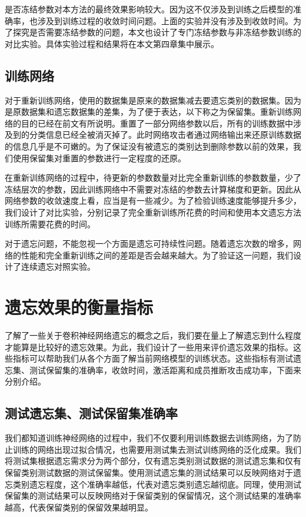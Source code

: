 是否冻结参数对本方法的最终效果影响较大。因为这不仅涉及到训练之后模型的准确率，也涉及到训练过程的收敛时间问题。上面的实验并没有涉及到收敛时间。为了探究是否需要冻结参数的问题，本文也设计了专门冻结参数与非冻结参数训练的对比实验。具体实验过程和结果将在本文第四章集中展示。

\subsection{训练网络}

对于重新训练网络，使用的数据集是原来的数据集减去要遗忘类别的数据集。因为是原数据集和遗忘数据集的差集，为了便于表达，以下称之为保留集。重新训练网络的目的已经在前文有所说明。重置了一部分网络参数以后，所有的训练数据中涉及到的分类信息已经全被消灭掉了。此时网络攻击者通过网络输出来还原训练数据的信息几乎是不可嫩的。为了保证没有被遗忘的类别达到删除参数以前的效果，我们使用保留集对重置的参数进行一定程度的还原。

在重新训练网络的过程中，待更新的参数数量对比完全重新训练的参数数量，少了冻结层次的参数，因此训练网络中不需要对冻结的参数去计算梯度和更新。因此从网络参数的收敛速度上看，应当是有一些减少。为了检验训练速度能够提升多少，我们设计了对比实验，分别记录了完全重新训练所花费的时间和使用本文遗忘方法训练所需要花费的时间。

对于遗忘问题，不能忽视一个方面是遗忘可持续性问题。随着遗忘次数的增多，网络的性能和完全重新训练之间的差距是否会越来越大。为了验证这一问题，我们设计了连续遗忘对照实验。

\section{遗忘效果的衡量指标}

了解了一些关于卷积神经网络遗忘的概念之后，我们要在量上了解遗忘到什么程度才能算是比较好的遗忘效果。为此，我们设计了一些用来评价遗忘效果的指标。这些指标可以帮助我们从各个方面了解当前网络模型的训练状态。这些指标有测试遗忘集、测试保留集的准确率，收敛时间，激活距离和成员推断攻击成功率，下面来分别介绍。
\subsection{测试遗忘集、测试保留集准确率}

我们都知道训练神经网络的过程中，我们不仅要利用训练数据去训练网络，为了防止训练的网络出现过拟合情况，也需要用测试集去测试训练网络的泛化成果。我们将测试集根据遗忘需求分为两个部分，仅有遗忘类别测试数据的测试遗忘集和仅有保留类别测试数据的测试保留集。使用测试遗忘集的测试结果可以反映网络对于遗忘类别遗忘程度，这个准确率越低，代表对遗忘类别遗忘越彻底。同理，使用测试保留集的测试结果可以反映网络对于保留类别的保留情况，这个测试结果的准确率越高，代表保留类别的保留效果越明显。

